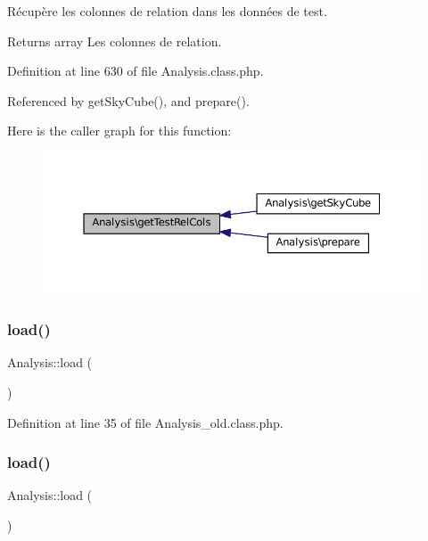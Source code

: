 Récupère les colonnes de relation dans les données de test.

\begin{DoxyReturn}{Returns}
array Les colonnes de relation. 
\end{DoxyReturn}


Definition at line 630 of file Analysis.\+class.\+php.



Referenced by get\+Sky\+Cube(), and prepare().

Here is the caller graph for this function\+:\nopagebreak
\begin{figure}[H]
\begin{center}
\leavevmode
\includegraphics[width=350pt]{class_analysis_a2a26317d11c76f0100c16807b3d5cd4e_icgraph}
\end{center}
\end{figure}
\mbox{\label{class_analysis_a212eda5284530c04b1e068cf53387215}} 
\subsubsection{\texorpdfstring{load()}{load()}\hspace{0.1cm}{\footnotesize\ttfamily [1/2]}}
{\footnotesize\ttfamily Analysis\+::load (\begin{DoxyParamCaption}{ }\end{DoxyParamCaption})\hspace{0.3cm}{\ttfamily [protected]}}



Definition at line 35 of file Analysis\+\_\+old.\+class.\+php.

\mbox{\label{class_analysis_a212eda5284530c04b1e068cf53387215}} 
\subsubsection{\texorpdfstring{load()}{load()}\hspace{0.1cm}{\footnotesize\ttfamily [2/2]}}
{\footnotesize\ttfamily Analysis\+::load (\begin{DoxyParamCaption}{ }\end{DoxyParamCaption})\hspace{0.3cm}{\ttfamily [protected]}}

